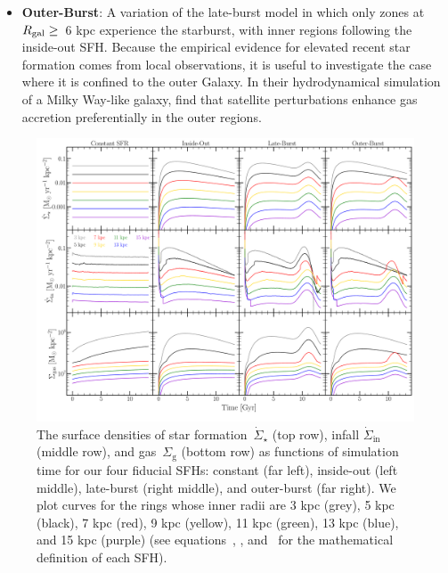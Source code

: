 \documentclass[draft2.tex]{subfiles}
\begin{document}
\begin{itemize}
	\item \textbf{Outer-Burst}: A variation of the late-burst model in which 
	only zones at~$R_\text{gal} \geq$~6 kpc experience the starburst, with inner 
	regions following the inside-out SFH. 
	Because the empirical evidence for elevated recent star formation comes 
	from local observations, it is useful to investigate the case where it is 
	confined to the outer Galaxy. 
	In their hydrodynamical simulation of a Milky Way-like galaxy, 
	\citet{Vincenzo2020} find that satellite perturbations enhance gas 
	accretion preferentially in the outer regions. 
\end{itemize} 

\begin{figure} 
\centering 
\includegraphics[scale = 0.32]{evol.pdf} 
\caption{The surface densities of star formation~$\dot{\Sigma}_\star$ (top 
row), infall $\dot{\Sigma}_\text{in}$ (middle row), and gas~$\Sigma_\text{g}$ 
(bottom row) as functions of simulation time for our four fiducial SFHs: 
constant (far left), inside-out (left middle), late-burst (right middle), and 
outer-burst (far right). We plot curves for the rings whose inner radii are 
3 kpc (grey), 5 kpc (black), 7 kpc (red), 9 kpc (yellow), 11 kpc (green), 13 
kpc (blue), and 15 kpc (purple) (see equations~, 
, and~ for the mathematical 
definition of each SFH). 
}
\label{fig:evol} 
\end{figure} 
\end{document}
